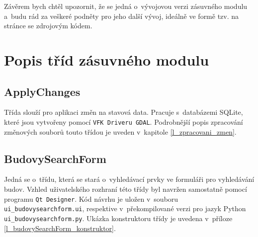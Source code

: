 \documentclass[a4paper,12pt,oneside]{book}
\begin{document}
Závěrem bych chtěl upozornit, že se jedná o~vývojovou verzi zásuvného
modulu a~budu rád za veškeré podněty pro jeho další vývoj, ideálně ve formě
tzv.  na stránce se zdrojovým kódem.



\clearpage
\rhead{{\rightmark}}	%
\renewcommand{\refname}{Použitá literatura}



\clearpage
\listoffigures

\clearpage
\listoftables

\clearpage
\lstlistoflistings

\newpage
\appendix

\setcounter{page}{1}   	%


\clearpage
\chapter{Popis tříd zásuvného modulu}

\section*{ApplyChanges}
Třída slouží pro aplikaci změn na stavová data. Pracuje s~databázemi SQLite,
které jsou vytvořeny pomocí \texttt{VFK Driveru GDAL}. Podrobnější popis 
zpracování změnových souborů touto třídou je uveden v~kapitole
\ref{l_zpracovani_zmen}.

\section*{BudovySearchForm}
Jedná se o~třídu, která se stará o~vyhledávací prvky ve formuláři pro
vyhledávání budov. Vzhled
uživatelského rozhraní této třídy byl navržen samostatně pomocí
programu \texttt{Qt Designer}. Kód návrhu je uložen v~souboru
\texttt{ui\_budovysearchform.ui}, respektive v~překompilované verzi
pro jazyk Python \texttt{ui\_budovysearchform.py}. Ukázka konstruktoru
třídy je uvedena v~příloze \ref{l_budovySearchForm_konstruktor}.
\end{document}
